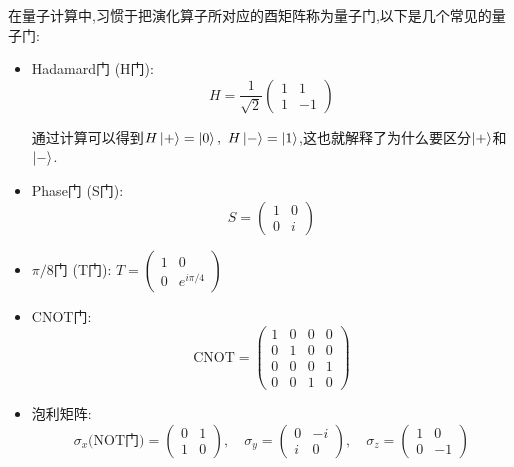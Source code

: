 \begin{example}
	在量子计算中,习惯于把演化算子所对应的酉矩阵称为量子门,以下是几个常见的量子门:
	\begin{spacing}{1}
		\begin{itemize}
			\item Hadamard门 (H门):
			$$
			H = \frac{1}{\sqrt{2}} \begin{pmatrix} 1 & 1 \\ 1 & -1 \end{pmatrix}\label{H-gate}
			$$
			
			通过计算可以得到$H\ket{+}=\ket{0},~H\ket{-}=\ket{1}$,这也就解释了为什么要区分$\ket{+}$和$\ket{-}$.
			
			\item Phase门 (S门):
			$$
			S = \begin{pmatrix} 1 & 0 \\ 0 & i \end{pmatrix}
			$$
			
			\item $\pi/8$门 (T门):
			$
			T = \begin{pmatrix} 1 & 0 \\ 0 & e^{i\pi/4} \end{pmatrix}
			$
			
			\item CNOT门:
			$$
			\text{CNOT} = \begin{pmatrix} 1 & 0 & 0 & 0 \\ 0 & 1 & 0 & 0 \\ 0 & 0 & 0 & 1 \\ 0 & 0 & 1 & 0 \end{pmatrix}
			$$
			
			\item 泡利矩阵\label{pauli}:
			$$
			\sigma_x \text{(NOT门)} = \begin{pmatrix} 0 & 1 \\ 1 & 0 \end{pmatrix}, \quad
			\sigma_y = \begin{pmatrix} 0 & -i \\ i & 0 \end{pmatrix}, \quad
			\sigma_z = \begin{pmatrix} 1 & 0 \\ 0 & -1 \end{pmatrix}
			$$
		\end{itemize}
	\end{spacing}
\end{example}


